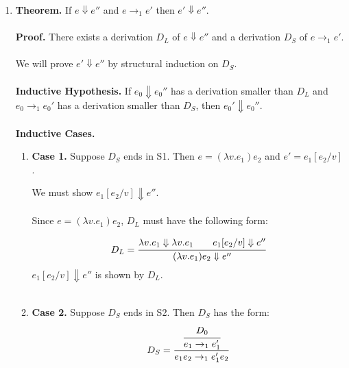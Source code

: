 \documentclass{article}
\begin{document}
\begin{enumerate}
\begin{enumerate}
        \item %
        \begin{equation}
            \begin{aligned}
                fold\_left &= Y(\lambda g. \lambda f. \lambda a. \lambda \ell.(isempty\ \ell\ ?\ a : g\ (f)\ (f\ a\ (head\ \ell))\ (tail\ \ell))) \\
            \end{aligned}
        \end{equation}
    \end{enumerate}

    \item %
    \textbf{Theorem.} If \(e \Downarrow e''\) and \(e \rightarrow_1 e'\) then \(e' \Downarrow e''\).
    \\~\\
    \textbf{Proof.}
    There exists a derivation \(D_L\) of \(e \Downarrow e''\) and a derivation \(D_S\) of
    \(e \rightarrow_1 e'\).
    \\~\\
    We will prove \(e' \Downarrow e''\) by structural induction on \(D_S\).
    \\~\\
    \textbf{Inductive Hypothesis.} If \(e_0 \Downarrow e_0''\) has a derivation smaller than \(D_L\)
    and \(e_0 \rightarrow_1 e_0'\) has a derivation smaller than \(D_S\),
    then \(e_0' \Downarrow e_0''\).
    \\~\\
    \textbf{Inductive Cases.}

    \begin{enumerate}
        \item[]\textbf{Case 1.}
        Suppose \(D_S\) ends in S1.
        Then \(e = (\lambda v.e_1) e_2\) and \(e' = e_1[e_2/v]\).

        We must show \(e_1[e_2/v] \Downarrow e''\).
        \\~\\
        Since \(e = (\lambda v.e_1) e_2\), \(D_L\) must have the following form:

        \begin{equation}
            \begin{aligned}
                D_L = \cfrac{\lambda v.e_1 \Downarrow \lambda v.e_1 \qquad e_1[e_2/v] \Downarrow e''}
                {(\lambda v.e_1) e_2 \Downarrow e''}
            \end{aligned}
        \end{equation}
        \(e_1[e_2/v] \Downarrow e''\) is shown by \(D_L\).
        \\~\\
        \item[]\textbf{Case 2.}
        Suppose \(D_S\) ends in S2.
        Then \(D_S\) has the form:
        \begin{equation}
            D_S = \cfrac{\cfrac{D_0}{e_1 \rightarrow_1 e_1'}}{e_1 e_2 \rightarrow_1 e_1' e_2} \\
        \end{equation}


\end{enumerate}
\end{enumerate}
\end{document}
